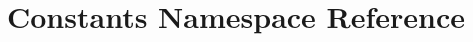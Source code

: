 \hypertarget{namespaceConstants}{}\section{Constants Namespace Reference}
\label{namespaceConstants}
